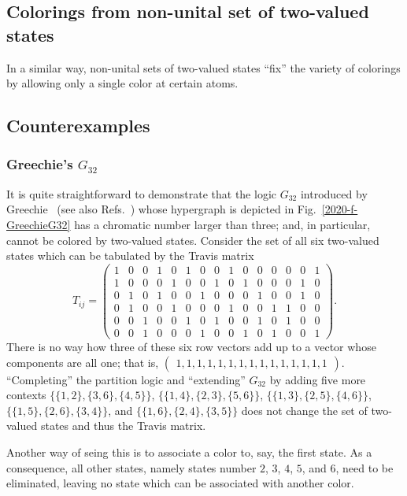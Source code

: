 \documentclass[%
  reprint,
  twocolumn,
 showpacs,
 showkeys,
 preprintnumbers,
 amsmath,amssymb,
 aps,
 pra,
  longbibliography,
 ]{revtex4-1}
\begin{document}
\subsection{Colorings from non-unital set of two-valued states}
In a similar way, non-unital sets of two-valued states ``fix'' the variety of colorings by allowing only a single color at certain atoms.

\subsection{Counterexamples}

\subsubsection{Greechie's $G_{32}$}

It is quite straightforward to demonstrate that the logic $G_{32}$ introduced by Greechie~\cite[Fig.~6, p.~121]{greechie:71}
(see also Refs.~\cite{Holland1975,Bennett-MC-1970,Greechie1974,Greechie-Suppes1976})
whose hypergraph is depicted in Fig.~\ref{2020-f-GreechieG32} has a chromatic number larger than three;
and, in particular, cannot be colored by two-valued states.
Consider the set of all six two-valued states which can be tabulated by the Travis matrix
\begin{equation}
T_{ij}=\begin{pmatrix}
1&0&0&1&0&1&0&0&1&0&0&0&0&0&1\\
1&0&0&0&1&0&0&1&0&1&0&0&0&1&0\\
0&1&0&1&0&0&1&0&0&0&1&0&0&1&0\\
0&1&0&0&1&0&0&0&1&0&0&1&1&0&0\\
0&0&1&0&0&1&0&1&0&0&1&0&1&0&0\\
0&0&1&0&0&0&1&0&0&1&0&1&0&0&1
\end{pmatrix}
.
\end{equation}
There is no way how three of these six row vectors add up to
a vector whose components are all one; that is,
$
\begin{pmatrix}
1,1,1,1,1,1,1,1,1,1,1,1,1,1,1
\end{pmatrix}
$.
``Completing'' the partition logic and ``extending''
$G_{32}$ by adding five more contexts
$\{\{1, 2\}, \{3, 6\}, \{4, 5\}\}$,
$\{\{1, 4\}, \{2, 3\}, \{5, 6\}\}$,
$\{\{1, 3\}, \{2, 5\}, \{4, 6\}\}$,
$\{\{1, 5\}, \{2, 6\}, \{3, 4\}\}$, and
$\{\{1, 6\}, \{2, 4\}, \{3, 5\}\}$
does not change the set of two-valued states and thus the Travis matrix.


Another way of seing this is to associate a color to, say, the first state.
As a consequence, all other states, namely states number
$2$,
$3$,
$4$,
$5$, and
$6$, need to be eliminated,
leaving no state which can be associated with
another color.
\end{document}
